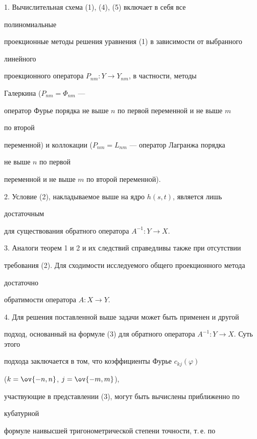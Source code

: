  


1. Вычислительная схема (1), (4), (5) включает в себя все 


полиномиальные 


проекционные методы решения уравнения (1) в зависимости от выбранного 


линейного 


проекционного оператора $P_{nm}:Y\to Y_{nm}$, в частности, методы 


Галеркина ($P_{nm}=\Phi_{nm}$ --- 


оператор Фурье порядка не выше $n$ по первой переменной и не выше $m$ 


по второй 


переменной) и коллокации ($P_{nm}=L_{nm}$ --- оператор Лагранжа порядка 


не выше $n$ по первой 


переменной и не выше $m$ по второй переменной). 


 


2. Условие (2), накладываемое выше на ядро $h(s,t)$, является лишь 


достаточным 


для существования обратного оператора $A^{-1}:Y\to X$. 


 


3. Аналоги теорем 1 и 2 и их следствий справедливы также при отсутствии 


требования (2). Для сходимости исследуемого общего проекционного метода 


достаточно 


обратимости оператора $A:X\to Y$. 


 


4. Для решения поставленной выше задачи может быть применен и другой 


подход, основанный на формуле (3) для обратного оператора $A^{-1}:Y\to 


X$. Суть этого 


подхода заключается в том, что коэффициенты Фурье $c_{k j}(\varphi)$ 


($k=\ov{-n,n}$, $j=\ov{-m,m}$), 


участвующие в представлении (3), могут быть вычислены приближенно по 


кубатурной 


формуле наивысшей тригонометрической степени точности, т.\,е. по 


